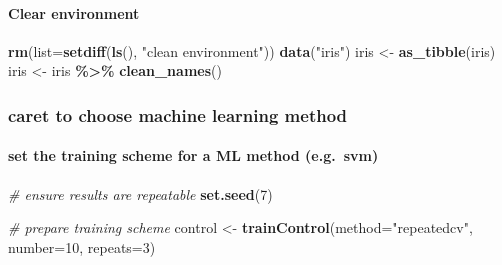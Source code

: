 \documentclass[
]{article}
\newenvironment{Shaded}{\begin{snugshade}}{\end{snugshade}}
\newcommand{\AttributeTok}[1]{\textcolor[rgb]{0.13,0.29,0.53}{#1}}
\newcommand{\CommentTok}[1]{\textcolor[rgb]{0.56,0.35,0.01}{\textit{#1}}}
\newcommand{\ConstantTok}[1]{\textcolor[rgb]{0.56,0.35,0.01}{#1}}
\newcommand{\DecValTok}[1]{\textcolor[rgb]{0.00,0.00,0.81}{#1}}
\newcommand{\FloatTok}[1]{\textcolor[rgb]{0.00,0.00,0.81}{#1}}
\newcommand{\FunctionTok}[1]{\textcolor[rgb]{0.13,0.29,0.53}{\textbf{#1}}}
\newcommand{\NormalTok}[1]{#1}
\newcommand{\OtherTok}[1]{\textcolor[rgb]{0.56,0.35,0.01}{#1}}
\newcommand{\SpecialCharTok}[1]{\textcolor[rgb]{0.81,0.36,0.00}{\textbf{#1}}}
\newcommand{\StringTok}[1]{\textcolor[rgb]{0.31,0.60,0.02}{#1}}
\begin{document}
\hypertarget{clear-environment-1}{%
\paragraph{Clear environment}\label{clear-environment-1}}

\begin{Shaded}
\begin{Highlighting}[]
\FunctionTok{rm}\NormalTok{(}\AttributeTok{list=}\FunctionTok{setdiff}\NormalTok{(}\FunctionTok{ls}\NormalTok{(), }\StringTok{"clean environment"}\NormalTok{))}
\FunctionTok{data}\NormalTok{(}\StringTok{"iris"}\NormalTok{)}
\NormalTok{iris }\OtherTok{\textless{}{-}} \FunctionTok{as\_tibble}\NormalTok{(iris)}
\NormalTok{iris }\OtherTok{\textless{}{-}}\NormalTok{ iris }\SpecialCharTok{\%\textgreater{}\%} \FunctionTok{clean\_names}\NormalTok{()}
\end{Highlighting}
\end{Shaded}

\hypertarget{caret-to-choose-machine-learning-method-1}{%
\subsubsection{caret to choose machine learning method}\label{caret-to-choose-machine-learning-method-1}}

\begin{Shaded}
\end{Shaded}

\hypertarget{set-the-training-scheme-for-a-ml-method-e.g.-svm}{%
\paragraph{set the training scheme for a ML method (e.g.~svm)}\label{set-the-training-scheme-for-a-ml-method-e.g.-svm}}

\begin{Shaded}
\begin{Highlighting}[]
\CommentTok{\# ensure results are repeatable}
\FunctionTok{set.seed}\NormalTok{(}\DecValTok{7}\NormalTok{)}

\CommentTok{\# prepare training scheme}
\NormalTok{control }\OtherTok{\textless{}{-}} \FunctionTok{trainControl}\NormalTok{(}\AttributeTok{method=}\StringTok{"repeatedcv"}\NormalTok{, }\AttributeTok{number=}\DecValTok{10}\NormalTok{, }\AttributeTok{repeats=}\DecValTok{3}\NormalTok{)}
\end{Highlighting}
\end{Shaded}
\end{document}
